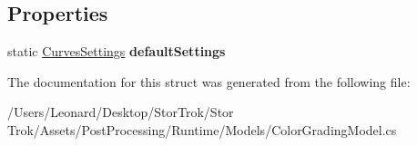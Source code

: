 \subsection*{Properties}
\begin{DoxyCompactItemize}
\item 
\mbox{\label{struct_unity_engine_1_1_post_processing_1_1_color_grading_model_1_1_curves_settings_a64d1e8f2e606f4d9cbd3fb89ace3c93d}} 
static \hyperlink{struct_unity_engine_1_1_post_processing_1_1_color_grading_model_1_1_curves_settings}{Curves\+Settings} {\bfseries default\+Settings}
\end{DoxyCompactItemize}


The documentation for this struct was generated from the following file\+:\begin{DoxyCompactItemize}
\item 
/\+Users/\+Leonard/\+Desktop/\+Stor\+Trok/\+Stor Trok/\+Assets/\+Post\+Processing/\+Runtime/\+Models/Color\+Grading\+Model.\+cs\end{DoxyCompactItemize}
